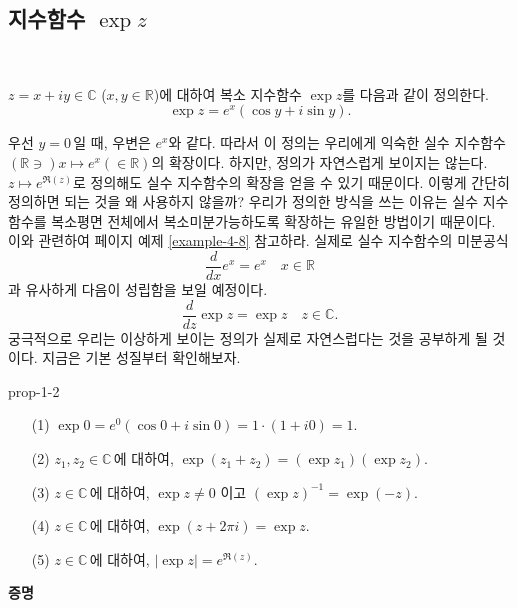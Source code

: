 \subsection{지수함수 $\exp z$} \label{sec-1-4-1}

\

\begin{saltdefinition}[복소 지수함수] {}{} \label{def-1-2}
$z=x+iy\in \mathbb C$ ($x,y\in\mathbb R$)에 대하여
복소 지수함수 $\exp z$를 다음과 같이 정의한다.
$$
\exp z = e^x(\cos y +i\sin y).
$$
\end{saltdefinition}

우선 $y=0$\,일 때, 우변은 $e^x$와 같다. 따라서 이 정의는
우리에게 익숙한 실수 지수함수 $(\mathbb R \ni) x \mapsto e^x (\in \mathbb R)$의 확장이다.
하지만, 정의가 자연스럽게 보이지는 않는다. 
$z\mapsto e^{\Re(z)}$로 정의해도 실수 지수함수의 확장을 얻을 수 있기 때문이다.
이렇게 간단히 정의하면 되는 것을 왜 사용하지 않을까?
우리가 정의한 방식을 쓰는 이유는
실수 지수함수를 복소평면 전체에서 복소미분가능하도록
확장하는 유일한 방법이기 때문이다. 
이와 관련하여 
\pageref{ex-page-4-8}페이지 %
예제 \ref{example-4-8}\를%
참고하라.
실제로 실수 지수함수의 미분공식
$$
\dfrac{d}{dx}e^x  = e^x \quad x\in\mathbb R
$$
과 유사하게 다음이 성립함을 보일 예정이다.
$$
\dfrac{d}{dz} \exp z  = \exp z \quad z\in\mathbb C.
$$
궁극적으로 우리는 이상하게 보이는 정의가 실제로 자연스럽다는 것을 공부하게 될 것이다.
지금은 기본 성질부터 확인해보자.


\begin{saltprop} {prop-1-2} {} %
\begin{itemize}
\item[(1)] $\exp 0 = e^0(\cos 0 + i\sin 0) = 1\cdot(1+i0) = 1$.
\item[(2)] $z_1, z_2\in \mathbb C\,$에 대하여, $\exp(z_1+z_2) = (\exp z_1)(\exp z_2)$.
\item[(3)] $z \in \mathbb C\,$에 대하여, $\exp z \ne 0$ 이고 $(\exp z)^{-1} = \exp (-z)$.
\item[(4)] $z \in \mathbb C\,$에 대하여, $\exp(z+2\pi i) = \exp z$.
\item[(5)] $z \in \mathbb C\,$에 대하여, $|\exp z| = e^{\Re(z)}$.
\end{itemize}  %
\end{saltprop}

{\bf 증명}

